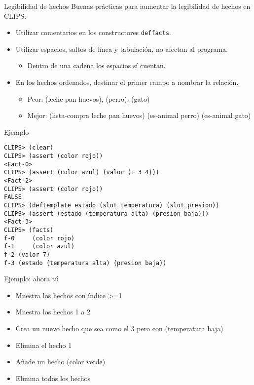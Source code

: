 \documentclass[usenames,dvipsnames,aspectratio=169]{beamer}
\begin{document}
\begin{frame}{Legibilidad de hechos}
	Buenas prácticas para aumentar la legibilidad de hechos en CLIPS:
	\begin{itemize}
		\item Utilizar comentarios en los constructores \texttt{deffacts}.
		\item Utilizar espacios, saltos de línea y tabulación, no afectan al programa.
		\begin{itemize}
			\item Dentro de una cadena los espacios sí cuentan.
		\end{itemize}
		\item En los hechos ordenados, destinar el primer campo a nombrar la relación.
		\begin{itemize}
			\item Peor: (leche pan huevos), (perro), (gato)
			\item Mejor: (lista-compra leche pan huevos) (es-animal perro) (es-animal gato)
		\end{itemize}
	\end{itemize}
\end{frame}

\begin{frame}[fragile]{Ejemplo}
\footnotesize
\begin{verbatim}
CLIPS> (clear)
CLIPS> (assert (color rojo))
<Fact-0>
CLIPS> (assert (color azul) (valor (+ 3 4)))
<Fact-2>
CLIPS> (assert (color rojo))
FALSE
CLIPS> (deftemplate estado (slot temperatura) (slot presion))
CLIPS> (assert (estado (temperatura alta) (presion baja)))
<Fact-3>
CLIPS> (facts)
f-0     (color rojo)
f-1     (color azul)
f-2 (valor 7)
f-3 (estado (temperatura alta) (presion baja))
\end{verbatim}
\end{frame}

\begin{frame}{Ejemplo: ahora tú}
	\begin{itemize}
		\item Muestra los hechos con índice >=1
		\item Muestra los hechos 1 a 2
		\item Crea un nuevo hecho que sea como el 3 pero con (temperatura baja)
		\item Elimina el hecho 1
		\item Añade un hecho (color verde)
		\item Elimina todos los hechos
	\end{itemize}
\end{frame}

\begin{frame}
\titlepage
\end{frame}
\end{document}
